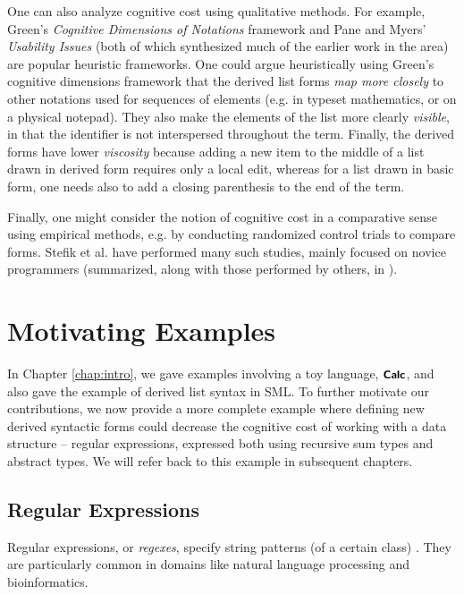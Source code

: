 One can also analyze cognitive cost using qualitative methods. For example, Green's \emph{Cognitive Dimensions of Notations} \cite{Green89,green1996usability} framework and Pane and Myers' \emph{Usability Issues} \cite{pane1996usability} (both of which synthesized much of the earlier work in the area) are popular heuristic frameworks. One could argue heuristically using Green's cognitive dimensions framework that the derived list forms \emph{map more closely} to other notations used for sequences of elements (e.g. in typeset mathematics, or on a physical notepad). They also make the elements of the list more clearly \emph{visible}, in that the identifier  is not interspersed throughout the term. Finally, the derived forms have lower \emph{viscosity} because adding a new item to the middle of a list drawn in derived form requires only a local edit, whereas for a list drawn in basic form, one needs also to add a closing parenthesis to the end of the term.

Finally, one might consider the notion of cognitive cost in a comparative sense using empirical methods, e.g. by conducting randomized control trials to compare forms. Stefik et al. have performed many such studies, mainly focused on novice programmers (summarized, along with those performed by others, in \cite{journals/jeric/StefikS13}). 



\section{Motivating Examples}\label{sec:motivating-examples}
In Chapter \ref{chap:intro}, we gave examples involving a toy language, $\textsf{\textbf{\small Calc}}$, and also gave the example of derived list syntax in SML. To further motivate our contributions, we now provide a more complete  example where defining new derived syntactic forms could  decrease the cognitive cost of working with a data structure -- regular expressions, expressed both using recursive sum types and abstract types. We will refer back to this example in subsequent chapters.%

\subsection{Regular Expressions}\label{sec:syntax-examples-regexps}
Regular expressions, or \emph{regexes}, specify string patterns (of a certain class) \cite{Thompson:1968:PTR:363347.363387}. They are particularly common in domains like natural language processing and bioinformatics.

